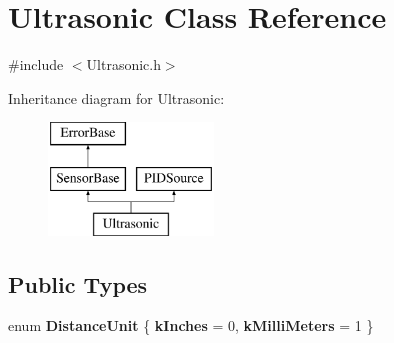 \hypertarget{classUltrasonic}{\section{\-Ultrasonic \-Class \-Reference}
\label{classUltrasonic}
}


{\ttfamily \#include $<$\-Ultrasonic.\-h$>$}

\-Inheritance diagram for \-Ultrasonic\-:\begin{figure}[H]
\begin{center}
\leavevmode
\includegraphics[height=3.000000cm]{classUltrasonic}
\end{center}
\end{figure}
\subsection*{\-Public \-Types}
\begin{DoxyCompactItemize}
\item 
enum {\bfseries \-Distance\-Unit} \{ {\bfseries k\-Inches} =  0, 
{\bfseries k\-Milli\-Meters} =  1
 \}
\end{DoxyCompactItemize}
